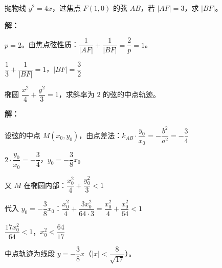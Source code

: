 \documentclass[12pt, a4paper]{ctexart}
\begin{document}
\begin{examplebox}[【例题2】焦点弦公式应用]
抛物线 $y^2=4x$，过焦点 $F(1,0)$ 的弦 $AB$，若 $|AF|=3$，求 $|BF|$。

\textbf{解：}

$p=2$。由焦点弦性质：$\dfrac{1}{|AF|}+\dfrac{1}{|BF|}=\dfrac{2}{p}=1$。

$\dfrac{1}{3}+\dfrac{1}{|BF|}=1$，$|BF|=\boxed{\dfrac{3}{2}}$
\end{examplebox}

\begin{examplebox}[【例题3】点差法求中点轨迹]
椭圆 $\dfrac{x^2}{4}+\dfrac{y^2}{3}=1$，求斜率为 $2$ 的弦的中点轨迹。

\textbf{解：}

设弦的中点 $M(x_0,y_0)$，由点差法：$k_{AB}\cdot\dfrac{y_0}{x_0}=-\dfrac{b^2}{a^2}=-\dfrac{3}{4}$

$2\cdot\dfrac{y_0}{x_0}=-\dfrac{3}{4}$，$y_0=-\dfrac{3}{8}x_0$

又 $M$ 在椭圆内部：$\dfrac{x_0^2}{4}+\dfrac{y_0^2}{3}<1$

代入 $y_0=-\dfrac{3}{8}x_0$：$\dfrac{x_0^2}{4}+\dfrac{3x_0^2}{64\cdot 3}=\dfrac{x_0^2}{4}+\dfrac{x_0^2}{64}<1$

$\dfrac{17x_0^2}{64}<1$，$x_0^2<\dfrac{64}{17}$

中点轨迹为线段 $y=-\dfrac{3}{8}x$（$|x|<\dfrac{8}{\sqrt{17}}$）。
\end{examplebox}
\end{document}

